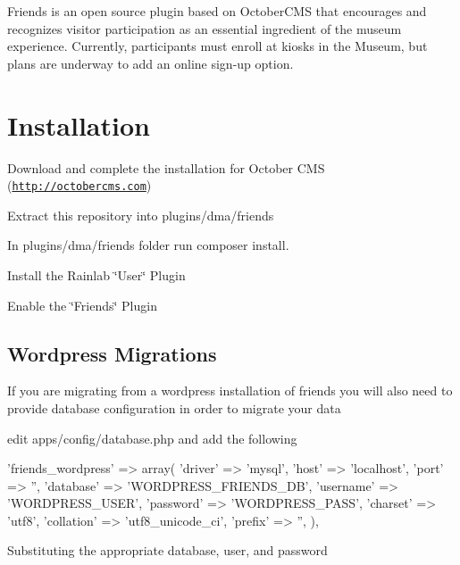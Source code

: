 Friends is an open source plugin based on October\+C\+M\+S that encourages and recognizes visitor participation as an essential ingredient of the museum experience. Currently, participants must enroll at kiosks in the Museum, but plans are underway to add an online sign-\/up option.

\section*{Installation}


\begin{DoxyItemize}
\item Download and complete the installation for October C\+M\+S (\href{http://octobercms.com}{\tt http\+://octobercms.\+com})
\item Extract this repository into plugins/dma/friends
\item In plugins/dma/friends folder run {\ttfamily composer install}.
\item Install the Rainlab \char`\"{}\+User\char`\"{} Plugin
\item Enable the \char`\"{}\+Friends\char`\"{} Plugin
\end{DoxyItemize}

\subsection*{Wordpress Migrations}

If you are migrating from a wordpress installation of friends you will also need to provide database configuration in order to migrate your data


\begin{DoxyItemize}
\item edit apps/config/database.\+php and add the following 
\begin{DoxyPre}
        'friends\_wordpress' => array(
            'driver'    => 'mysql',
            'host'      => 'localhost',
            'port'      => '', 
            'database'  => 'WORDPRESS\_FRIENDS\_DB',
            'username'  => 'WORDPRESS\_USER',
            'password'  => 'WORDPRESS\_PASS',
            'charset'   => 'utf8',
            'collation' => 'utf8\_unicode\_ci',
            'prefix'    => '', 
        ), 
\end{DoxyPre}
 Substituting the appropriate database, user, and password 
\end{DoxyItemize}